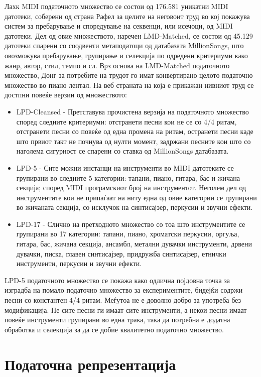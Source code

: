 Лахк MIDI податочното множество се состои од 176.581 уникатни MIDI датотеки, соберени од страна Рафел за целите на неговоит труд \cite{Raffel2016} во кој покажува систем за пребарување и споредување на секвенци, или исечоци, од MIDI датотеки. Дел од овие множеството, наречен LMD-Matched, се состои од 45.129 датотеки спарени со соодвенти метаподатоци од датабазата MillionSongs, што овозможува пребарување, групирање и селекција по одредени критериуми како жанр, автор, стил, темпо и сл. 
Врз основа на LMD-Matched податочното множество, Донг за потребите на трудот \cite{Dong2017} го имат конвертирано целото податочно множество во пиано лентал. На веб страната на која е прикажан нивниот труд се достпни повеќе верзии од множеството:

\begin{itemize}
    \item LPD-Cleansed - Претставува прочистена верзија на податочното множество според следните критериуми: отстранети песни кои не се со 4/4 ритам, отстранети песни со повеќе од една промена на ритам, остранети песни каде што првиот такт не почнува од нулти момент, задржани песните кои што со наголема сигурност се спарени со ставка од MillionSongs датабазата.
    \item LPD-5 - Сите можни инстанци на инструменти во MIDI датотеките се групирани во следните 5 категории: тапани, пиано, гитара, бас и жичана секција; според MIDI програмскиот број на инструментот. Неголем дел од инструментите кои не припаѓаат на ниту една од овие категории се групирани во жичаната секција, со исклучок на синтисајзер, перкусии и звучни ефекти.
    \item LPD-17 - Слично на претходното множество со тоа што инструментите се групирани во 17 категории: тапани, пиано, хроматски перкусии, оргуља, гитара, бас, жичана секција, ансамбл, метални дувачки инструменти, дрвени дувачки, писка, главен синтисајзер, придружба синтисајзер, етнички инструменти, перкусии и звучни ефекти.
\end{itemize}

LPD-5 податочното множество се покажа како одлична појдовна точка за изградба на помало податочно множество за експериментите, бидејќи содржи песни со константен 4/4 ритам. Меѓутоа не е доволно добро за употреба без модификација. Не сите песни ги имаат сите инструменти, а некои песни имаат повеќе инструменти групирани во една трака, така да потребна е додатна обработка и селекција за да се добие квалитетно податочно множество.

\section{Податочна репрезентација}

